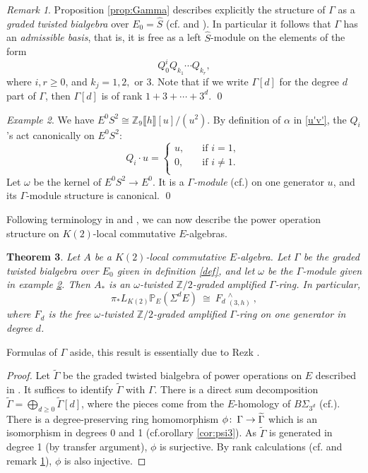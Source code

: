 \documentclass{gtpart}
\newtheorem{thm}{Theorem}
\theoremstyle{definition}
\theoremstyle{remark}
\newtheorem{rmk}[thm]{Remark}
\newtheorem{exam}[thm]{Example}
\def\co{\colon\thinspace}
\newcommand{\mb}[1]{\mathbb{#1}}
\newcommand{\cff}[2]{cf.\thinspace{\cite[#1]{#2}}}
\newcommand{\BP}{{\mb P}}
\newcommand{\BZ}{{\mb Z}}
\newcommand{\HS}{\widehat{S}}
\newcommand{\TG}{\widetilde{\G}}
\newcommand{\A}{\alpha}
\newcommand{\G}{\Gamma}
\begin{document}
\begin{rmk}
\label{rmk:rank}
 Proposition \ref{prop:Gamma} describes explicitly the structure of $\G$ as a {\em graded twisted bialgebra} over $E_0 = \HS$ (\cff{section 5}{cong} and \cite[2.1]{h2p2}).  
 In particular it follows that $\G$ has an {\em admissible basis}, that is, it is free as a left $\HS$-module on the elements of the form 
 \[
  Q_0^i Q_{k_1} \cdots Q_{k_r}, 
 \]
 where $i, r \geq 0$, and $k_j = 1, 2,$ or 3.  
 Note that if we write $\G[d]$ for the degree $d$ part of $\G$, then $\G[d]$ is of rank $1 + 3 + \cdots + 3^d$.  
\qed
\end{rmk}

\begin{exam}
\label{ex:omega}
 We have $E^0 S^2 \cong \BZ_9 \llbracket h \rrbracket [u] / (u^2)$.  
 By definition of $\A$ in \eqref{u'v'}, the $Q_i$'s act canonically on $E^0 S^2$: 
 \[
  Q_i \cdot u = \left\{
  \begin{array}{ll}
    u,  & \quad \text{if $i = 1$, }\\
    0,  & \quad \text{if $i \neq 1$.  }\\
  \end{array}
  \right.
 \]
 Let $\omega$ be the kernel of $E^0 S^2 \to E^0$.  It is a {\em $\G$-module} (\cff{2.2}{h2p2}) on one generator $u$, and its $\G$-module structure is canonical.  
\qed
\end{exam}

Following terminology in \cite[section 2]{cong} and \cite[2.5 and 2.6]{h2p2}, we can now describe the power operation structure on $K(2)$-local commutative $E$-algebras.  
\begin{thm}
\label{thm}
 Let $A$ be a $K(2)$-local commutative $E$-algebra.  
 Let $\G$ be the graded twisted bialgebra over $E_0$ given in definition \ref{def}, and let $\omega$ be the $\G$-module given in example \ref{ex:omega}.  
 Then $A_*$ is an {\em $\omega$-twisted $\BZ/2$-graded amplified $\G$-ring}.  In particular, 
 \[
  \pi_* L_{K(2)} \BP_E (\Sigma^d E) ~ \cong ~ {F_d}~_{(3,h)}^{\wedge} ~ , 
 \]
 where $F_d$ is the free $\omega$-twisted $\BZ/2$-graded amplified $\G$-ring on one generator in degree $d$.  
\end{thm}
Formulas of $\G$ aside, this result is essentially due to Rezk \cite{cong, h2p2}.  
\begin{proof}
 Let $\TG$ be the graded twisted bialgebra of power operations on $E$ described in \cite[section 6]{cong}.  
 It suffices to identify $\TG$ with $\G$.  
 There is a direct sum decomposition $\TG = \bigoplus_{d \geq 0} \TG[d]$, where the pieces come from the $E$-homology of $B\Sigma_{3^d}$ (\cff{6.2}{cong}).  
 There is a degree-preserving ring homomorphism $\phi \co \G \to \TG$ which is an isomorphism in degrees 0 and 1 (cf.orollary \ref{cor:psi3}).  
 As $\TG$ is generated in degree 1 (by transfer argument), $\phi$ is surjective.  
 By rank calculations (\cff{section 6}{ST} and remark \ref{rmk:rank}), $\phi$ is also injective.  
\end{proof}
\end{document}
